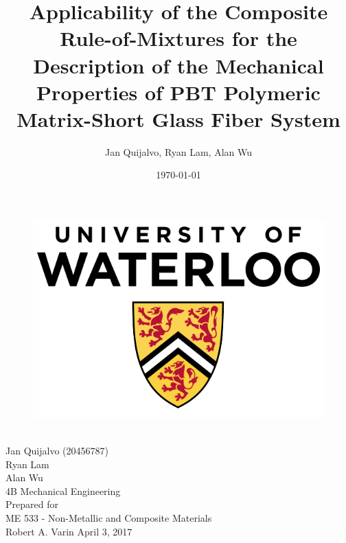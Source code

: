 \documentclass[11pt]{article}
\begin{document}
\doublespacing

\title{\textbf{Applicability of the Composite Rule-of-Mixtures for the Description of the Mechanical Properties of PBT Polymeric Matrix-Short Glass Fiber System}}
\author{Jan Quijalvo, Ryan Lam, Alan Wu}
\date{\today}


\makeatletter
    \singlespacing
    \begin{titlepage}
        \begin{center}
        	\begin{figure}[h]
        	\centering
            \includegraphics[scale=0.3]{./figures/University-of-Waterloo}
            \end{figure}
            \vspace{20mm}
            {\huge \bfseries  \@title }\\[2ex] 
            \vspace{5mm}
            {\LARGE Jan Quijalvo (20456787)}\\
            \vspace{2mm}
            {\LARGE Ryan Lam}\\
            \vspace{2mm}
            {\LARGE Alan Wu}\\
            \vspace{2mm}
            \LARGE 4B Mechanical Engineering\\[12ex]
            Prepared for\\
            ME 533 - Non-Metallic and Composite Materials\\
            Robert A. Varin
            \centering
            \vfill
            {\large April 3, 2017}
        \end{center}
    \end{titlepage}
\makeatother
\end{document}
